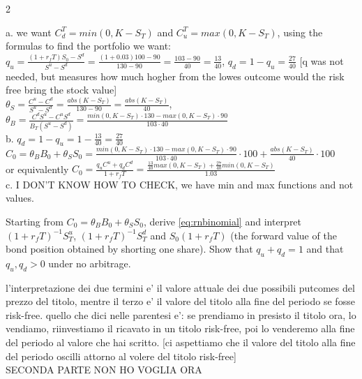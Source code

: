 \begin{paracol}{2}
\begin{mysolution}
  a. we want $C_d^T = min(0,K-S_T)$ and $C_u^T = max(0,K-S_T)$, using the formulas to find the portfolio we want: \\
  $q_u = \frac{(1+r_fT)S_0 - S^d}{S^u - S^d} = \frac{(1+0.03)100 - 90}{130 - 90} = \frac{103 - 90}{40} = \frac{13}{40}$, $q_d = 1 - q_u = \frac{27}{40}$ [q was not needed, but measures how much hogher from the lowes outcome would the risk free bring the stock value]  \\
  $\theta_S = \frac{C^u - C^d}{S^u - S^d} = \frac{abs(K-S_T)}{130 - 90} = \frac{abs(K-S_T)}{40}$, $\theta_B = \frac{C^d S^u - C^u S^d}{B_T(S^u - S^d)} = \frac{min(0,K-S_T)\cdot 130 - max(0,K-S_T)\cdot 90}{103\cdot 40}$ \\
  b. $q_d = 1- q_u = 1 - \frac{13}{40} = \frac{27}{40}$ \\
  $C_0 = \theta_B B_0 + \theta_S S_0 = \frac{min(0,K-S_T)\cdot 130 - max(0,K-S_T)\cdot 90}{103\cdot 40} \cdot 100 + \frac{abs(K-S_T)}{40} \cdot 100$ \\
  or equivalently $C_0 = \frac{q_u C^u + q_d C^d}{1+r_fT} = \frac{\frac{13}{40} max(0,K-S_T) + \frac{27}{40} min(0,K-S_T)}{1.03}$ \\
  c. I DON'T KNOW HOW TO CHECK, we have min and max functions and not values.
\end{mysolution}

\begin{exercise}
Starting from $C_0=\theta_BB_0+\theta_SS_0$, derive \eqref{eq:rnbinomial} and interpret
$(1+r_fT)^{-1}S_T^{u}$, $(1+r_fT)^{-1}S_T^{d}$ and $S_0(1+r_fT)$ (the forward value of the bond position
obtained by shorting one share). Show that $q_u+q_d=1$ and that $q_u,q_d>0$ under no arbitrage.
\end{exercise}
\begin{mysolution}
  l'interpretazione dei due termini e' il valore attuale dei due possibili putcomes del prezzo del titolo, mentre il terzo e' il valore del titolo alla fine del periodo se fosse risk-free. quello che dici nelle parentesi e': se prendiamo in presisto il titolo ora, lo vendiamo, riinvestiamo il ricavato in un titolo risk-free, poi lo venderemo alla fine del periodo al valore che hai scritto. [ci aspettiamo che il valore del titolo alla fine del periodo oscilli attorno al volere del titolo risk-free] \\
  SECONDA PARTE NON HO VOGLIA ORA
\end{mysolution}


\end{paracol}
